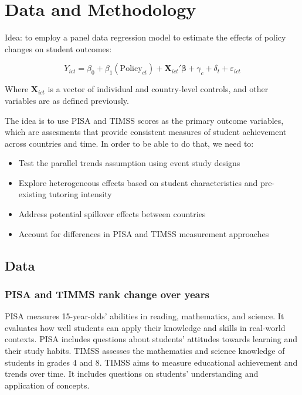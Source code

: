 \documentclass[12pt,a4paper,onecolumn]{article}
\numberwithin{equation}{section}
\begin{document}
\section{Data and Methodology}

Idea: to employ a panel data regression model to estimate the effects of policy changes on student outcomes:

\begin{equation}
Y_{ict} = \beta_0 + \beta_1(\text{Policy}_{ct}) + \mathbf{X}_{ict}'\boldsymbol{\beta} + \gamma_c + \delta_t + \varepsilon_{ict}
\end{equation}


Where $\mathbf{X}_{ict}$ is a vector of individual and country-level controls, and other variables are as defined previously.

The idea is to use PISA and TIMSS scores as the primary outcome variables, which are assesments that provide consistent measures of student achievement across countries and time. In order to be able to do that, we need to:

\begin{itemize}
    \item Test the parallel trends assumption using event study designs
    \item Explore heterogeneous effects based on student characteristics and pre-existing tutoring intensity
    \item Address potential spillover effects between countries
    \item Account for differences in PISA and TIMSS measurement approaches
\end{itemize}

\subsection{Data}

\subsubsection{PISA and TIMMS rank change over years}
PISA measures 15-year-olds' abilities in reading, mathematics, and science. It evaluates how well students can apply their knowledge and skills in real-world contexts. PISA includes questions about students' attitudes towards learning and their study habits. TIMSS assesses the mathematics and science knowledge of students in grades 4 and 8. TIMSS aims to measure educational achievement and trends over time. It includes questions on students' understanding and application of concepts.
\end{document}
